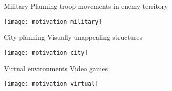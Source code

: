 \begin{frame}{Military}
	Planning troop movements in enemy territory

	\vspace{0.5cm}
	\centering
	\texttt{[image: motivation-military]}
\end{frame}

\begin{frame}{City planning}
	Visually unappealing structures

	\vspace{0.5cm}
	\centering
	\texttt{[image: motivation-city]}
\end{frame}

\begin{frame}{Virtual environments}
	Video games

	\vspace{0.5cm}
	\centering
	\texttt{[image: motivation-virtual]}
\end{frame}
